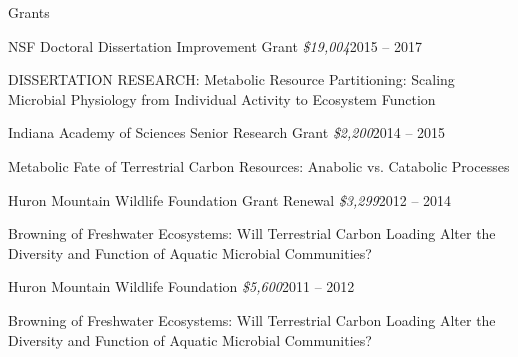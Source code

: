 \documentclass{resume} %
\begin{document}
\begin{rSection}{Grants}

    \begin{rSubsection}{NSF Doctoral Dissertation Improvement Grant
      {\normalfont \em \$19,004}}{2015 -- 2017}{}{}
      \item DISSERTATION RESEARCH: Metabolic Resource Partitioning: Scaling
      Microbial Physiology from Individual Activity to Ecosystem Function
    \end{rSubsection}

    \begin{rSubsection}{Indiana Academy of Sciences Senior Research Grant
      {\normalfont \em \$2,200}}{2014 -- 2015}{}{}
      \item Metabolic Fate of Terrestrial Carbon Resources: Anabolic vs.
      Catabolic Processes
    \end{rSubsection}

    \begin{rSubsection}{Huron Mountain Wildlife Foundation Grant Renewal
      {\normalfont \em \$3,299}}{2012 -- 2014}{}{}
      \item Browning of Freshwater Ecosystems: Will Terrestrial Carbon Loading
      Alter the Diversity and Function of Aquatic Microbial Communities?
    \end{rSubsection}

    \begin{rSubsection}{Huron Mountain Wildlife Foundation
      {\normalfont \em \$5,600}}{2011 -- 2012}{}{}
      \item Browning of Freshwater Ecosystems: Will Terrestrial Carbon Loading
      Alter the Diversity and Function of Aquatic Microbial Communities?
    \end{rSubsection}

\end{rSection}

\end{document}
